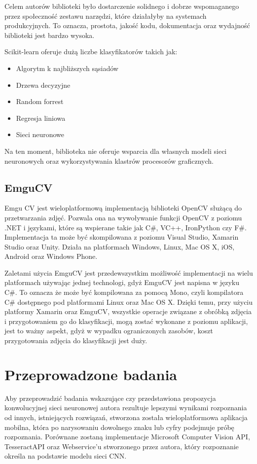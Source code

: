 \documentclass[brudnopis]{xmgr}
\begin{document}
Celem autorów biblioteki było dostarczenie solidnego i dobrze wspomaganego przez społeczność zestawu narzędzi, które działałyby na systemach produkcyjnych. To oznacza,  prostota, jakość kodu, dokumentacja oraz wydajność biblioteki jest bardzo wysoka.

Scikit-learn oferuje dużą liczbe klasyfikatorów takich jak:
\begin{itemize}
\item
Algorytm k najbliższych sąsiadów
\item
Drzewa decyzyjne
\item
Random forrest
\item
Regresja liniowa
\item
Sieci neuronowe
\end{itemize}

Na ten moment, biblioteka nie oferuje wsparcia dla własnych modeli sieci neuronowych oraz wykorzystywania klastrów procesorów graficznych.

\section{EmguCV}

Emgu CV jest wieloplatformową implementacją biblioteki OpenCV służącą do przetwarzania zdjęć. Pozwala ona na wywoływanie funkcji OpenCV z poziomu .NET i językami, które są wspierane takie jak C\#, VC++, IronPython czy F\#. Implementacja ta może być skompilowana z poziomu Visual Studio, Xamarin Studio oraz Unity. Działa na platformach Windows, Linux, Mac OS X, iOS, Android oraz Windows Phone.

Zaletami użycia EmguCV jest przedewszystkim możliwość implementacji na wielu platformach używając jednej technologi, gdyż EmguCV jest napisna w języku C\#. To oznacza że może być kompilowana za pomocą Mono, czyli kompilatora C\# dostępnego pod platformami Linux oraz Mac OS X. Dzięki temu, przy użyciu platformy Xamarin oraz EmguCV, wszystkie operacje związane z obróbką zdjęcia i przygotowaniem go do klasyfikacji, mogą zostać wykonane z poziomu aplikacji, jest to ważny aspekt, gdyż w wypadku ograniczonych zasobów, koszt przygotowania zdjęcia do klasyfikacji jest duży.

\chapter{Przeprowadzone badania}

Aby przeprowadzić badania wskazujące czy przedstawiona propozycja konwolucyjnej sieci neuronowej autora rezultuje lepszymi wynikami rozpoznania od innych, istniejących rozwiązań, stworzona została wieloplatformowa aplikacja mobilna, która po narysowaniu dowolnego znaku lub cyfry podejmuje próbę rozpoznania.
Porównane zostaną implementacje Microsoft Computer Vision API, TesseractAPI oraz Webservice'u stworzonego przez autora, który rozpoznanie określa na podstawie modelu sieci CNN.
\end{document}
